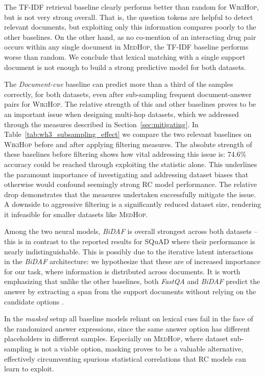 \documentclass[11pt,letterpaper]{article}
\newcommand{\MedHop}{\textsc{MedHop}\xspace}
\newcommand{\WikiHop}{\textsc{WikiHop}\xspace}
\begin{document}
The TF-IDF retrieval baseline clearly performs better than random for \WikiHop, but is not very strong overall.
That is, the question tokens are helpful to detect relevant documents, but exploiting only this information compares poorly to the other baselines.
On the other hand, as no co-mention of an interacting drug pair occurs within any single document in \MedHop, the TF-IDF baseline performs worse than random.
We conclude that lexical matching with a single support document is not enough to build a strong predictive model for both datasets.


The \emph{Document-cue} baseline can predict more than a third of the samples correctly, for both datasets, even after sub-sampling frequent document-answer pairs for \WikiHop.
The relative strength of this and other baselines proves to be an important issue when designing multi-hop datasets, which we addressed through the measures described in Section~\ref{sec:mitigating}.
In Table~\ref{tab:wh3_subsampling_effect} we compare the two relevant baselines on \WikiHop before and after applying filtering measures.
The absolute strength of these baselines before filtering shows how vital addressing this issue is: 74.6\% accuracy could be reached through exploiting the  statistic alone.
This underlines the paramount importance of investigating and addressing dataset biases that otherwise would confound seemingly strong RC model performance.
The relative drop demonstrates that the measures undertaken successfully mitigate the issue.
A downside to aggressive filtering is a significantly reduced dataset size, rendering it infeasible for smaller datasets like \MedHop.


Among the two neural models, \emph{BiDAF} is overall strongest across both datasets -- this is in contrast to the reported results for SQuAD where their performance is nearly indistinguishable.
This is possibly due to the iterative latent interactions in the \emph{BiDAF} architecture: we hypothesize that these are of increased importance for our task, where information is distributed across documents.
It is worth emphasizing that unlike the other baselines, both \emph{FastQA} and \emph{BiDAF} predict the answer by extracting a span from the support documents without relying on the candidate options .

In the \emph{masked} setup all baseline models reliant on lexical cues fail in the face of the randomized answer expressions, since the same answer option has different placeholders in different samples.
Especially on \MedHop, where dataset sub-sampling is not a viable option, masking proves to be a valuable alternative, effectively circumventing spurious statistical correlations that RC models can learn to exploit.
\end{document}
